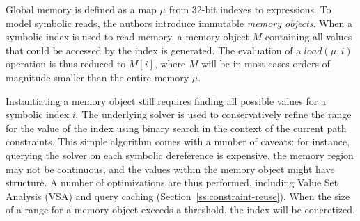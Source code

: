 Global memory is defined as a map $\mu$ from 32-bit indexes to expressions. To model symbolic reads, the authors introduce immutable {\em memory objects}. When a symbolic index is used to read memory, a memory object $M$ containing all values that could be accessed by the index is generated. The evaluation of a $load(\mu,i)$ operation is thus reduced to $M[i]$, where $M$ will be in most cases orders of magnitude smaller than the entire memory $\mu$.

Instantiating a memory object still requires finding all possible values for a symbolic index $i$. The underlying solver is used to conservatively refine the range for the value of the index using binary search in the context of the current path constraints. This simple algorithm comes with a number of caveats: for instance, querying the solver on each symbolic dereference is expensive, the memory region may not be continuous, and the values within the memory object might have structure. A number of optimizations are thus performed, including  Value Set Analysis (VSA) and query caching (Section~\ref{ss:constraint-reuse}). When the size of a range for a memory object exceeds a threshold, the index will be concretized.

